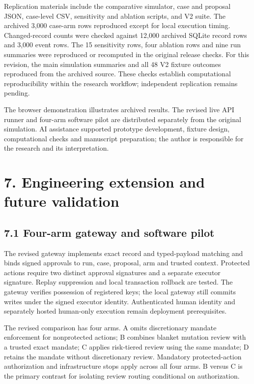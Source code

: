 \documentclass[11pt,letterpaper]{article}
\begin{document}
Replication materials include the comparative simulator, case and proposal JSON, case-level CSV, sensitivity and ablation scripts, and V2 suite. The archived 3,000 case-arm rows reproduced except for local execution timing. Changed-record counts were checked against 12,000 archived SQLite record rows and 3,000 event rows. The 15 sensitivity rows, four ablation rows and nine run summaries were reproduced or recomputed in the original release checks. For this revision, the main simulation summaries and all 48 V2 fixture outcomes reproduced from the archived source. These checks establish computational reproducibility within the research workflow; independent replication remains pending.

The browser demonstration illustrates archived results. The revised live API runner and four-arm software pilot are distributed separately from the original simulation. AI assistance supported prototype development, fixture design, computational checks and manuscript preparation; the author is responsible for the research and its interpretation.

\section*{7. Engineering extension and future validation}
\subsection*{7.1 Four-arm gateway and software pilot}
The revised gateway implements exact record and typed-payload matching and binds signed approvals to run, case, proposal, arm and trusted context. Protected actions require two distinct approval signatures and a separate executor signature. Replay suppression and local transaction rollback are tested. The gateway verifies possession of registered keys; the local gateway still commits writes under the signed executor identity. Authenticated human identity and separately hosted human-only execution remain deployment prerequisites.

The revised comparison has four arms. A omits discretionary mandate enforcement for nonprotected actions; B combines blanket mutation review with a trusted exact mandate; C applies risk-tiered review using the same mandate; D retains the mandate without discretionary review. Mandatory protected-action authorization and infrastructure stops apply across all four arms. B versus C is the primary contrast for isolating review routing conditional on authorization.
\end{document}
